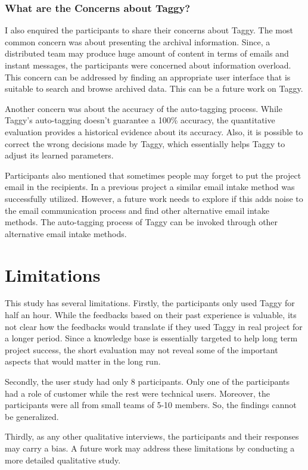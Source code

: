 \subsubsection{What are the Concerns about Taggy?}
I also enquired the participants to share their concerns about Taggy. The most common concern was about presenting the archival information. Since, a distributed team may produce huge amount of content in terms of emails and instant messages, the participants were concerned about information overload. This concern can be addressed by finding an appropriate user interface that is suitable to search and browse archived data. This can be a future work on Taggy.

Another concern was about the accuracy of the auto-tagging process. While Taggy's auto-tagging doesn't guarantee a 100\% accuracy, the quantitative evaluation provides a historical evidence about its accuracy. Also, it is possible to correct the wrong decisions made by Taggy, which essentially helps Taggy to adjust its learned parameters.

Participants also mentioned that sometimes people may forget to put the project email in the recipients. In a previous project a similar email intake method was successfully utilized\cite{where_did_you}. However, a future work needs to explore if this adds noise to the email communication process and find other alternative email intake methods. The auto-tagging process of Taggy can be invoked through other alternative email intake methods.

\section{Limitations}
This study has several limitations. Firstly, the participants only used Taggy for half an hour. While the feedbacks based on their past experience is valuable, its not clear how the feedbacks would translate if they used Taggy in real project for a longer period. Since a knowledge base is essentially targeted to help long term project success, the short evaluation may not reveal some of the important aspects that would matter in the long run.

Secondly, the user study had only 8 participants. Only one of the participants had a role of customer while the rest were technical users. Moreover, the participants were all from small teams of 5-10 members. So, the findings cannot be generalized.

Thirdly, as any other qualitative interviews, the participants and their responses may carry a bias. A future work may address these limitations by conducting a more detailed qualitative study.



